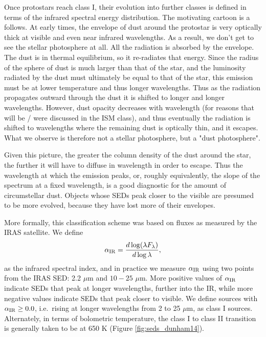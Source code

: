 Once protostars reach class I, their evolution into further classes is defined in terms of the infrared spectral energy distribution. The motivating cartoon is a follows. At early times, the envelope of dust around the protostar is very optically thick at visible and even near infrared wavelengths. As a result, we don't get to see the stellar photosphere at all. All the radiation is absorbed by the envelope. The dust is in thermal equilibrium, so it re-radiates that energy. Since the radius of the sphere of dust is much larger than that of the star, and the luminosity radiated by the dust must ultimately be equal to that of the star, this emission must be at lower temperature and thus longer wavelengths. Thus as the radiation propagates outward through the dust it is shifted to longer and longer wavelengths. However, dust opacity decreases with wavelength (for reasons that will be / were discussed in the ISM class), and thus eventually the radiation is shifted to wavelengths where the remaining dust is optically thin, and it escapes. What we observe is therefore not a stellar photosphere, but a "dust photosphere".

Given this picture, the greater the column density of the dust around the star, the further it will have to diffuse in wavelength in order to escape. Thus the wavelength at which the emission peaks, or, roughly equivalently, the slope of the spectrum at a fixed wavelength, is a good diagnostic for the amount of circumstellar dust. Objects whose SEDs peak closer to the visible are presumed to be more evolved, because they have lost more of their envelopes.

More formally, this classification scheme was based on fluxes as measured by the IRAS satellite. We define
\begin{equation}
\alpha_{\rm IR} = \frac{d\log (\lambda F_{\lambda})}{d\log\lambda},
\end{equation}
as the infrared spectral index, and in practice we measure $\alpha_{\rm IR}$ using two points from the IRAS SED: 2.2 $\mu$m and $10-25$ $\mu$m. More positive values of $\alpha_{\rm IR}$ indicate SEDs that peak at longer wavelengths, further into the IR, while more negative values indicate SEDs that peak closer to visible. We define sources with $\alpha_{\rm IR}\geq 0.0$, i.e.\ rising at longer wavelengths from 2 to 25 $\mu$m, as class I sources. Alternately, in terms of bolometric temperature, the class I to class II transition is generally taken to be at 650 K (Figure \ref{fig:seds_dunham14}).

